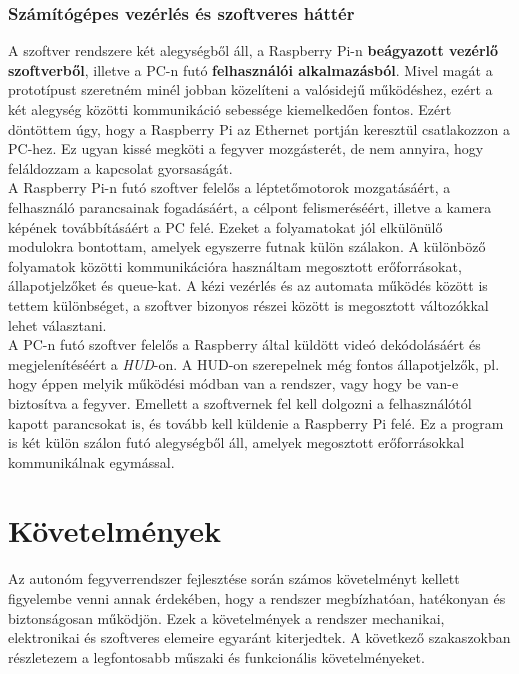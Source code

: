 \subsubsection*{Számítógépes vezérlés és szoftveres háttér}
A szoftver rendszere két alegységből áll, a Raspberry Pi-n \textbf{beágyazott vezérlő szoftverből}, illetve a PC-n futó \textbf{felhasználói alkalmazásból}. Mivel magát a prototípust szeretném minél jobban közelíteni a valósidejű működéshez, ezért a két alegység közötti kommunikáció sebessége kiemelkedően fontos. Ezért döntöttem úgy, hogy a Raspberry Pi az Ethernet portján keresztül csatlakozzon a PC-hez. Ez ugyan kissé megköti a fegyver mozgásterét, de nem annyira, hogy feláldozzam a kapcsolat gyorsaságát. \\

A Raspberry Pi-n futó szoftver felelős a léptetőmotorok mozgatásáért, a felhasználó parancsainak fogadásáért, a célpont felismeréséért, illetve a  kamera képének továbbításáért a PC felé. Ezeket a folyamatokat jól elkülönülő modulokra bontottam, amelyek egyszerre futnak külön szálakon. A különböző folyamatok közötti kommunikációra használtam megosztott erőforrásokat, állapotjelzőket és queue-kat. A kézi vezérlés és az automata működés között is tettem különbséget, a szoftver bizonyos részei között is megosztott változókkal lehet választani. \\

A PC-n futó szoftver felelős a Raspberry által küldött videó dekódolásáért és megjelenítéséért a \textsl{HUD}-on. A HUD-on szerepelnek még fontos állapotjelzők, pl. hogy éppen melyik működési módban van a rendszer, vagy hogy be van-e biztosítva a fegyver. Emellett a szoftvernek fel kell dolgozni a felhasználótól kapott parancsokat is, és tovább kell küldenie a Raspberry Pi felé. Ez a program is két külön szálon futó alegységből áll, amelyek megosztott erőforrásokkal kommunikálnak egymással. 

\pagebreak

\section{Követelmények}\label{sec:kov}


Az autonóm fegyverrendszer fejlesztése során számos követelményt kellett figyelembe venni annak érdekében, hogy a rendszer megbízhatóan, hatékonyan és biztonságosan működjön. Ezek a követelmények a rendszer mechanikai, elektronikai és szoftveres elemeire egyaránt kiterjedtek. A következő szakaszokban részletezem a legfontosabb műszaki és funkcionális követelményeket.


